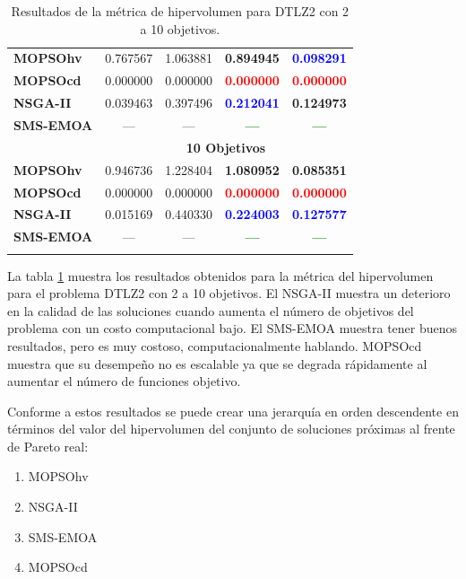 \begin{longtable}{|l|cc|cc|}
	\hline\hline
	\textbf{MOPSOhv} &0.767567 & 1.063881 & \textbf{0.894945} & \textbf{\textcolor{blue}{0.098291}} \\ 
	\textbf{MOPSOcd} &0.000000 & 0.000000 & \textbf{\textcolor{red}{0.000000}} & \textbf{\textcolor{red}{0.000000}} \\ 
	\textbf{NSGA-II} &0.039463 & 0.397496 & \textbf{\textcolor{blue}{0.212041}} & \textbf{0.124973} \\ 
	\textbf{SMS-EMOA} & --- & --- & \textbf{\textcolor{green}{---}} & \textbf{\textcolor{green}{---}} \\
	\hline\hline
 & \multicolumn{4}{|c|}{\textbf{10 Objetivos}} \\ 
	\hline\hline
	\textbf{MOPSOhv} &0.946736 & 1.228404 & \textbf{1.080952} & \textbf{0.085351}   \\ 
	\textbf{MOPSOcd} &0.000000 & 0.000000 & \textbf{\textcolor{red}{0.000000}} & \textbf{\textcolor{red}{0.000000}} \\ 
	\textbf{NSGA-II} &0.015169 & 0.440330 & \textbf{\textcolor{blue}{0.224003}} & \textbf{\textcolor{blue}{0.127577}} \\  
	\textbf{SMS-EMOA} & --- & --- & \textbf{\textcolor{green}{---}} & \textbf{\textcolor{green}{---}} \\
	\hline\hline
\caption{Resultados de la m\'etrica de hipervolumen para DTLZ2 con 2 a 10 objetivos.}
  \label{tab:dtlz2_hv}
\end{longtable}

La tabla \ref{tab:dtlz2_hv} muestra los resultados obtenidos para la m\'etrica del hipervolumen para el problema 
DTLZ2 con 2 a 10 objetivos. El NSGA-II muestra un deterioro en la 
calidad de las soluciones cuando aumenta el n\'umero de objetivos del problema con un costo 
computacional bajo. El SMS-EMOA muestra tener buenos resultados, pero es muy costoso, 
computacionalmente hablando. 
MOPSOcd muestra que su desempe\~no no es escalable ya que se degrada r\'apidamente al aumentar el n\'umero de 
funciones objetivo. 

Conforme a estos resultados se puede crear una
jerarqu\'ia en orden descendente en t\'erminos del valor del hipervolumen del conjunto de soluciones pr\'oximas al frente de Pareto real:

\begin{enumerate}
  \item MOPSOhv
  \item NSGA-II
  \item SMS-EMOA
  \item MOPSOcd
\end{enumerate}

